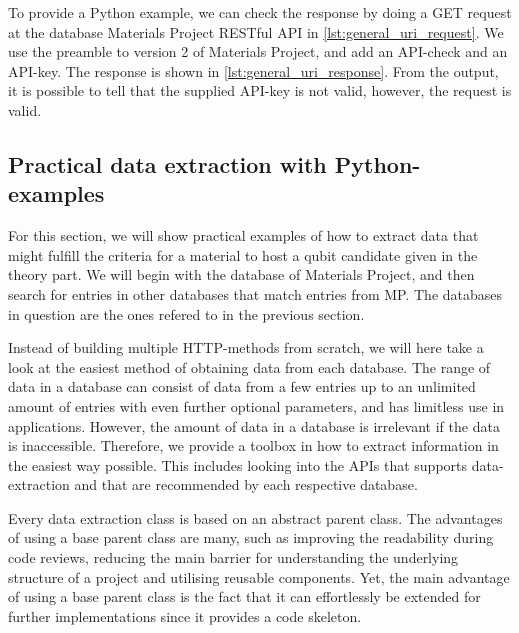 To provide a Python example, we can check the response by doing a GET request at the database Materials Project RESTful API in \autoref{lst:general_uri_request}. We use the preamble to version 2 of Materials Project, and add an API-check and an API-key. The response is shown in \autoref{lst:general_uri_response}. From the output, it is possible to tell that the supplied API-key is not valid, however, the request is valid.


\subsection{Practical data extraction with Python-examples}

For this section, we will show practical examples of how to extract data that might fulfill the criteria for a material to host a qubit candidate given in the theory part. We will begin with the database of Materials Project, and then search for entries in other databases that match entries from MP. The databases in question are the ones refered to in the previous section.

Instead of building multiple HTTP-methods from scratch, we will here take a look at the easiest method of obtaining data from each database. The range of data in a database can consist of data from a few entries up to an unlimited amount of entries with even further optional parameters, and has limitless use in applications. However, the amount of data in a database is irrelevant if the data is inaccessible. Therefore, we provide a toolbox in how to extract information in the easiest way possible. This includes looking into the APIs that supports data-extraction and that are recommended by each respective database.



Every data extraction class is based on an abstract parent class. The advantages of using a base parent class are many, such as improving the readability during code reviews, reducing the main barrier for understanding the underlying structure of a project and utilising reusable components. Yet, the main advantage of using a base parent class is the fact that it can effortlessly be extended for further implementations since it provides a code skeleton.


